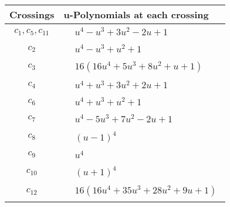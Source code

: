 \documentclass[1p]{elsarticle_modified}
\theoremstyle{definition}
\begin{document}
\begin{tabular}{m{50pt}|m{274pt}}
Crossings & \hspace{64pt}u-Polynomials at each crossing \\
\hline $$\begin{aligned}c_{1},c_{5},c_{11}\end{aligned}$$&$\begin{aligned}
&u^4- u^3+3 u^2-2 u+1
\end{aligned}$\\
\hline $$\begin{aligned}c_{2}\end{aligned}$$&$\begin{aligned}
&u^4- u^3+u^2+1
\end{aligned}$\\
\hline $$\begin{aligned}c_{3}\end{aligned}$$&$\begin{aligned}
&16(16 u^4+5 u^3+8 u^2+u+1)
\end{aligned}$\\
\hline $$\begin{aligned}c_{4}\end{aligned}$$&$\begin{aligned}
&u^4+u^3+3 u^2+2 u+1
\end{aligned}$\\
\hline $$\begin{aligned}c_{6}\end{aligned}$$&$\begin{aligned}
&u^4+u^3+u^2+1
\end{aligned}$\\
\hline $$\begin{aligned}c_{7}\end{aligned}$$&$\begin{aligned}
&u^4-5 u^3+7 u^2-2 u+1
\end{aligned}$\\
\hline $$\begin{aligned}c_{8}\end{aligned}$$&$\begin{aligned}
&(u-1)^4
\end{aligned}$\\
\hline $$\begin{aligned}c_{9}\end{aligned}$$&$\begin{aligned}
&u^4
\end{aligned}$\\
\hline $$\begin{aligned}c_{10}\end{aligned}$$&$\begin{aligned}
&(u+1)^4
\end{aligned}$\\
\hline $$\begin{aligned}c_{12}\end{aligned}$$&$\begin{aligned}
&16(16 u^4+35 u^3+28 u^2+9 u+1)
\end{aligned}$\\
\hline
\end{tabular}\\~\\
\end{document}

